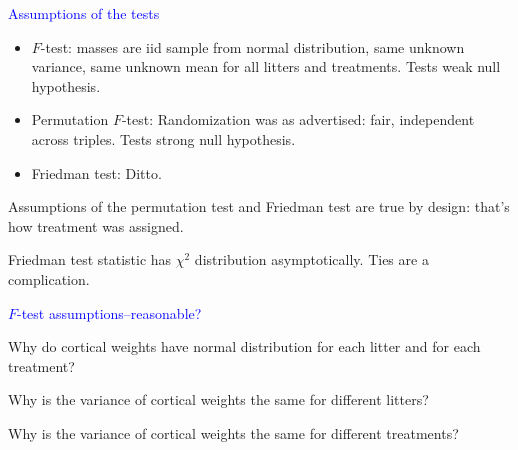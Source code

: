 \documentclass[landscape]{slides}
\begin{document}
\begin {slide}
{\textcolor{blue}{\sc Assumptions of the tests}}

\begin{itemize}
	\item $F$-test: 
	      {\textcolor{one}{masses are iid sample from normal distribution,
	      same unknown variance, same unknown mean for all litters and treatments.}}  
	      Tests weak null hypothesis.
	\item Permutation $F$-test:
	      {\textcolor{one}{Randomization was as advertised: fair, independent 
	      across triples.}}
	      Tests strong null hypothesis.
	\item Friedman test: 
	      {\textcolor{one}{Ditto}.}
\end{itemize}
Assumptions of the permutation test and Friedman test are true by design: 
that's how treatment was assigned.

Friedman test statistic has  $\chi^2$ distribution asymptotically.  Ties are a complication.

\end {slide}


\begin {slide}
{\textcolor{blue}{\sc $F$-test assumptions--reasonable?}}

{\textcolor{one}{Why do cortical weights have normal distribution for each
litter and for each treatment?}}

{\textcolor{one}{Why is the variance of cortical weights the same for different
litters?}}

{\textcolor{one}{Why is the variance of cortical weights the same for
different treatments?}}

\end {slide}

%
%
%
%
\end{document}

